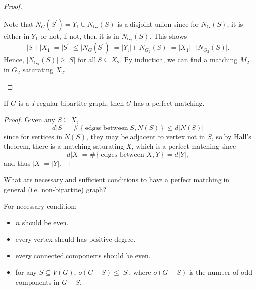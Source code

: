 \begin{proof}
\begin{itemize}
\begin{itemize}
\[            \]
            Note that \(N_G(S^{\prime} ) = Y_1 \cup N_{G_2}(S)\) is a disjoint union since for \(N_G(S)\), it is either in \(Y_1\) or not, if not, then it is in \(N_{G_2}(S)\).   
            This shows
            \[
                \vert S \vert + \vert X_1 \vert = \vert S^{\prime}  \vert \le \vert N_G(S^{\prime} ) \vert = \vert Y_1 \vert + \vert N_{G_2}(S) \vert = \vert X_1 \vert + \vert N_{G_2}(S) \vert.        
            \]
            Hence, \(\vert N_{G_2}(S) \vert \ge \vert S \vert  \) for all \(S \subseteq X_2\). By induction, we can find a matching \(M_2\) in \(G_2\) saturating \(X_2\).    
        \end{itemize}
    \end{itemize} 
\end{proof}

\begin{corollary}
    If \(G\) is a \(d\)-regular bipartite graph, then \(G\) has a perfect matching.   
\end{corollary}

\begin{proof}
    Given any \(S \subseteq X\), 
    \[
        d \vert S \vert = \#\left\{ \text{edges between } S, N(S)  \right\}  \le d \vert N(S) \vert  
    \] 
    since for vertices in \(N(S)\), they may be adjacent to vertex not in \(S\), so by Hall's theorem, there is a matching saturating \(X\), which is a perfect matching since
    \[
        d \vert X \vert = \#\left\{ \text{edges between } X, Y  \right\} = d \vert Y \vert,   
    \] 
    and thus \(\vert X \vert = \vert Y \vert  \). 
\end{proof}

\begin{question}
    What are necessary and sufficient conditions to have a perfect matching in general (i.e. non-bipartite) graph?
\end{question}

For necessary condition:
\begin{itemize}
    \item \(n\) should be even. 
    \item every vertex should has positive degree. 
    \item every connected components should be even.  
    \item for any \(S \subseteq V(G)\), \(o(G - S) \le \vert S \vert \), where \(o(G - S)\) is the number of odd components in \(G - S\).   
\end{itemize}

